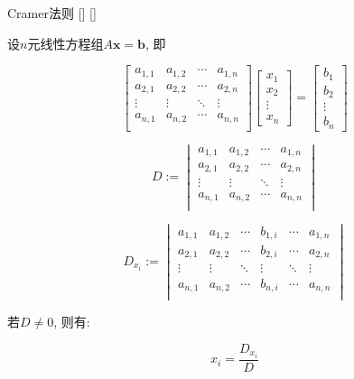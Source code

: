 \documentclass[UTF8]{ctexart}
\begin{document}
		\begin{thm}
			[]
			{Cramer法则}
			[]
			[]

			设$n$元线性方程组$A\mathbf{x}=\mathbf{b}$, 即
			
			$$\begin{bmatrix}
				a_{1,1} & a_{1,2} & \cdots & a_{1,n}\\
				a_{2,1} & a_{2,2} & \cdots & a_{2,n}\\
				\vdots & \vdots & \ddots & \vdots\\
				a_{n,1} & a_{n,2} & \cdots & a_{n,n}\\
			\end{bmatrix}
			\begin{bmatrix}
				x_1\\
				x_2\\
				\vdots\\
				x_n
			\end{bmatrix}=
			\begin{bmatrix}
				b_1\\
				b_2\\
				\vdots\\
				b_n
			\end{bmatrix}$$
			
			$$D:=
			\begin{vmatrix}
				a_{1,1} & a_{1,2} & \cdots & a_{1,n}\\
				a_{2,1} & a_{2,2} & \cdots & a_{2,n}\\
				\vdots & \vdots & \ddots & \vdots\\
				a_{n,1} & a_{n,2} & \cdots & a_{n,n}\\
			\end{vmatrix}$$
			
			$$D_{x_i}:=
			\begin{vmatrix}
				a_{1,1} & a_{1,2} & \cdots & b_{1,i} & \cdots & a_{1,n}\\
				a_{2,1} & a_{2,2} & \cdots & b_{2,i} & \cdots & a_{2,n}\\
				\vdots & \vdots & \ddots & \vdots & \ddots & \vdots\\
				a_{n,1} & a_{n,2} & \cdots & b_{n,i} & \cdots & a_{n,n}\\
			\end{vmatrix}$$
			
			若$D\neq 0$, 则有: 
			
			$$x_i=\frac{D_{x_i}}{D}$$
		\end{thm}
\end{document}
